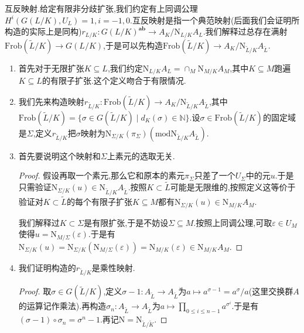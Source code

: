 互反映射.给定有限非分歧扩张,我们约定有上同调公理$H^i(G(L/K),U_L)=1,i=-1,0$.互反映射是指一个典范映射(后面我们会证明所构造的实际上是同构)$r_{L/K}:G(L/K)^{\textbf{ab}}\to A_K/\mathrm{N}_{L/K}A_L$.我们解释过总存在满射$\mathrm{Frob}(\widetilde{L}/K)\to G(L/K)$,于是可以先构造$\mathrm{Frob}(\widetilde{L}/K)\to A_K/\mathrm{N}_{\widetilde{L}/K}A_{\widetilde{L}}$.
\begin{enumerate}
	\item 首先对于无限扩张$K\subseteq L$,我们约定$\mathrm{N}_{L/K}A_L=\cap_M\mathrm{N}_{M/K}A_M$,其中$K\subseteq M$跑遍$K\subseteq L$的有限子扩张.这个定义吻合于有限情况.
	\item 我们先来构造映射$r_{\widetilde{L}/K}:\mathrm{Frob}(\widetilde{L}/K)\to A_K/\mathrm{N}_{\widetilde{L}/K}A_{\widetilde{L}}$,其中$\mathrm{Frob}(\widetilde{L}/K)=\{\sigma\in G(\widetilde{L}/K)\mid d_K(\sigma)\in\mathbb{N}\}$.设$\sigma\in\mathrm{Frob}(\widetilde{L}/K)$的固定域是$\Sigma$,定义$r_{\widetilde{L}/K}$把$\sigma$映射为$\mathrm{N}_{\Sigma/K}(\pi_{\Sigma})(\mathrm{mod}\mathrm{N}_{\widetilde{L}/K}A_{\widetilde{L}})$.
	\item 首先要说明这个映射和$\Sigma$上素元的选取无关.
	\begin{proof}
		
		假设再取一个素元,那么它和原本的素元$\pi_{\Sigma}$只差了一个$U_{\Sigma}$中的元$u$.于是只需验证$\mathrm{N}_{\Sigma/K}(u)\in\mathrm{N}_{\widetilde{L}/K}A_{\widetilde{L}}$.按照$K\subset\widetilde{L}$可能是无限维的,按照定义这等价于验证对$K\subset\widetilde{L}$的每个有限子扩张$K\subseteq M$都有$\mathrm{N}_{\Sigma/K}(u)\in\mathrm{N}_{M/K}A_M$.
		
		我们解释过$K\subset\Sigma$是有限扩张,于是不妨设$\Sigma\subseteq M$.按照上同调公理,可取$\varepsilon\in U_M$使得$u=\mathrm{N}_{M/\Sigma}(\varepsilon)$.于是有$\mathrm{N}_{\Sigma/K}(u)=\mathrm{N}_{\Sigma/K}(\mathrm{N}_{M/\Sigma}(\varepsilon))=\mathrm{N}_{M/K}(\varepsilon)\in\mathrm{N}_{M/K}A_M$.
	\end{proof}
    \item 我们证明构造的$r_{\widetilde{L}/K}$是乘性映射.
    \begin{proof}
    	
    	取$\sigma\in G(\widetilde{L}/K)$,定义$\sigma-1:A_{\widetilde{L}}\to A_{\widetilde{L}}$为$a\mapsto a^{\sigma-1}=a^{\sigma}/a$(这里交换群$A$的运算记作乘法).再构造$\sigma_n:A_{\widetilde{L}}\to A_{\widetilde{L}}$为$a\mapsto\prod_{0\le i\le n-1}a^{\sigma^i}$.于是有$(\sigma-1)\circ\sigma_n=\sigma^n-1$.再记$\mathrm{N}=\mathrm{N}_{\widetilde{L}/\widetilde{K}}$.
    	

\end{proof}
\end{enumerate}
